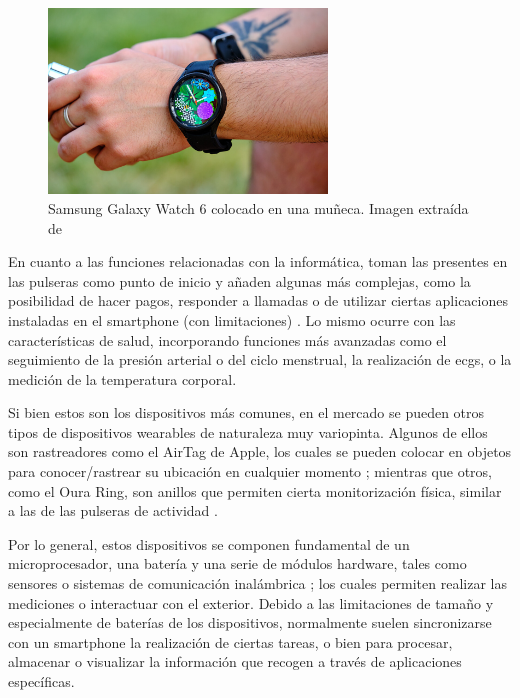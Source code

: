         \begin{figure}[h]
            \centering
            \includegraphics[width=0.66\textwidth]{figures/Samsung galaxy watch 6.jpeg}
            \caption[Samsung Galaxy Watch 6 colocado en una muñeca.]
            {Samsung Galaxy Watch 6 colocado en una muñeca. Imagen extraída de \cite{alcolea_samsung_2023}}
            \label{figure:wearables:watch_6}
        \end{figure}

        En cuanto a las funciones relacionadas con la informática, toman las presentes en las pulseras como punto de inicio y añaden algunas más complejas, como la posibilidad de hacer pagos, responder a llamadas o de utilizar ciertas aplicaciones instaladas en el \gls{smartphone} (con limitaciones) \cite{alcolea_samsung_2023}. Lo mismo ocurre con las características de salud, incorporando funciones más avanzadas como el seguimiento de la presión arterial o del ciclo menstrual, la realización de \glspl{ecg}, o la medición de la temperatura corporal.

        Si bien estos son los dispositivos más comunes, en el mercado se pueden otros tipos de dispositivos \glspl{wearable} de naturaleza muy variopinta. Algunos de ellos son rastreadores como el AirTag de Apple, los cuales se pueden colocar en objetos para conocer/rastrear su ubicación en cualquier momento \cite{raspall_airtag_2024}; mientras que otros, como el Oura Ring, son anillos que permiten cierta monitorización física, similar a las de las pulseras de actividad \cite{garcia_oura_2021}.

        Por lo general, estos dispositivos se componen fundamental de un microprocesador, una batería y una serie de módulos hardware, tales como sensores o sistemas de comunicación inalámbrica \cite{luque_ordonez_dispositivos_2016}; los cuales permiten realizar las mediciones o interactuar con el exterior. Debido a las limitaciones de tamaño y especialmente de baterías de los dispositivos, normalmente suelen sincronizarse con un \gls{smartphone} la realización de ciertas tareas, o bien para procesar, almacenar o visualizar la información que recogen a través de aplicaciones específicas.

